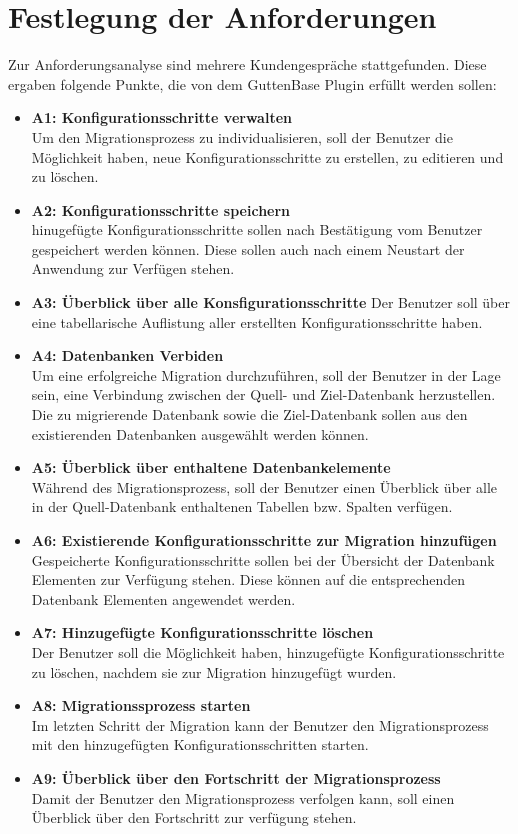 \section{Festlegung der Anforderungen}
\label{anaylse}
Zur Anforderungsanalyse sind mehrere Kundengespräche stattgefunden. Diese ergaben folgende Punkte, die von dem GuttenBase Plugin erfüllt werden sollen:
\begin{itemize}
	\item \textbf{A1: Konfigurationsschritte verwalten}\\
	Um den Migrationsprozess zu individualisieren, soll der Benutzer die Möglichkeit haben, neue Konfigurationsschritte zu erstellen, zu editieren und zu löschen.
	\item \textbf{A2: Konfigurationsschritte speichern} \\
	hinugefügte Konfigurationsschritte sollen nach Bestätigung vom Benutzer gespeichert werden können. Diese sollen auch nach einem Neustart der Anwendung zur Verfügen stehen.
	\item \textbf{A3: Überblick über alle Konsfigurationsschritte}
	Der Benutzer soll über eine tabellarische Auflistung aller erstellten Konfigurationsschritte haben.\\
	\item \textbf{A4: Datenbanken Verbiden} \\
	Um eine erfolgreiche Migration durchzuführen, soll der Benutzer in der Lage sein, eine Verbindung zwischen der Quell- und Ziel-Datenbank herzustellen. Die zu migrierende Datenbank sowie die Ziel-Datenbank sollen aus den existierenden Datenbanken ausgewählt werden können.
	\item \textbf{A5: Überblick über enthaltene Datenbankelemente}\\
	Während des Migrationsprozess, soll der Benutzer einen Überblick über alle in der Quell-Datenbank enthaltenen Tabellen bzw. Spalten verfügen.
	\item \textbf{A6: Existierende Konfigurationsschritte zur Migration hinzufügen}\\
	Gespeicherte Konfigurationsschritte sollen bei der Übersicht der Datenbank Elementen zur Verfügung stehen. Diese können auf die entsprechenden Datenbank Elementen angewendet werden.
	\item \textbf{A7: Hinzugefügte Konfigurationsschritte löschen}\\	
	Der Benutzer soll die Möglichkeit haben, hinzugefügte Konfigurationsschritte zu löschen, nachdem sie zur Migration hinzugefügt wurden.
	\item \textbf{A8: Migrationssprozess starten} \\
	Im letzten Schritt der Migration kann der Benutzer den Migrationsprozess mit den hinzugefügten Konfigurationsschritten starten.	
	\item \textbf{A9: Überblick über den Fortschritt der Migrationsprozess}\\
	Damit der Benutzer den Migrationsprozess verfolgen kann, soll einen Überblick über den Fortschritt zur verfügung stehen. 
\end{itemize}




